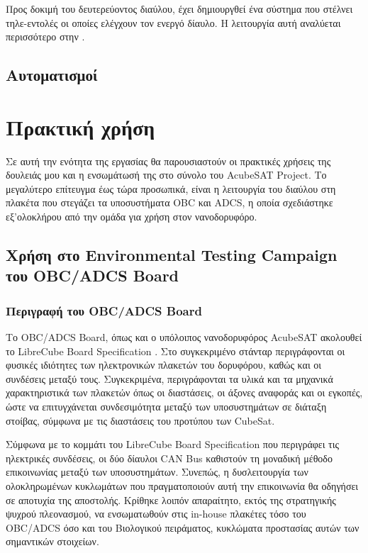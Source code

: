 \documentclass[a4paper,nobib,justified]{tufte-book}
\begin{document}
Προς δοκιμή του δευτερεύοντος διαύλου, έχει δημιουργθεί ένα σύστημα που στέλνει τηλε-εντολές οι οποίες ελέγχουν τον ενεργό δίαυλο. Η λειτουργία αυτή αναλύεται περισσότερο στην .

\clearpage

\section{Αυτοματισμοί}

\clearpage

\chapter{Πρακτική χρήση}
\label{usage}
Σε αυτή την ενότητα της εργασίας θα παρουσιαστούν οι πρακτικές χρήσεις της δουλειάς μου και η ενσωμάτωσή της στο σύνολο του AcubeSAT Project. Το μεγαλύτερο επίτευγμα έως τώρα προσωπικά, είναι η λειτουργία του διαύλου στη πλακέτα που στεγάζει τα υποσυστήματα OBC και ADCS, η οποία σχεδιάστηκε εξ'ολοκλήρου από την ομάδα για χρήση στον νανοδορυφόρο.
\section{Χρήση στο Environmental Testing Campaign του OBC/ADCS Board}
\subsection{Περιγραφή του OBC/ADCS Board}
 Το OBC/ADCS Board, όπως και ο υπόλοιπος νανοδορυφόρος AcubeSAT ακολουθεί το LibreCube Board Specification . Στο συγκεκριμένο στάνταρ περιγράφονται οι φυσικές ιδιότητες των ηλεκτρονικών πλακετών του δορυφόρου, καθώς και οι συνδέσεις μεταξύ τους. Συγκεκριμένα, περιγράφονται τα υλικά και τα μηχανικά χαρακτηριστικά των πλακετών όπως οι διαστάσεις, οι άξονες αναφοράς και οι εγκοπές, ώστε να επιτυγχάνεται συνδεσιμότητα μεταξύ των υποσυστημάτων σε διάταξη στοίβας, σύμφωνα με τις διαστάσεις του προτύπου των CubeSat.

Σύμφωνα με το κομμάτι του LibreCube Board Specification που περιγράφει τις ηλεκτρικές συνδέσεις, οι δύο δίαυλοι CAN Bus καθιστούν τη μοναδική μέθοδο επικοινωνίας μεταξύ των υποσυστημάτων. Συνεπώς, η δυσλειτουργία των ολοκληρωμένων κυκλωμάτων που πραγματοποιούν αυτή την επικοινωνία θα οδηγήσει σε αποτυχία της αποστολής. Κρίθηκε λοιπόν απαραίτητο, εκτός της στρατηγικής ψυχρού πλεονασμού, να ενσωματωθούν στις in-house πλακέτες τόσο του OBC/ADCS όσο και του Βιολογικού πειράματος, κυκλώματα προστασίας αυτών των σημαντικών στοιχείων. 
\end{document}
